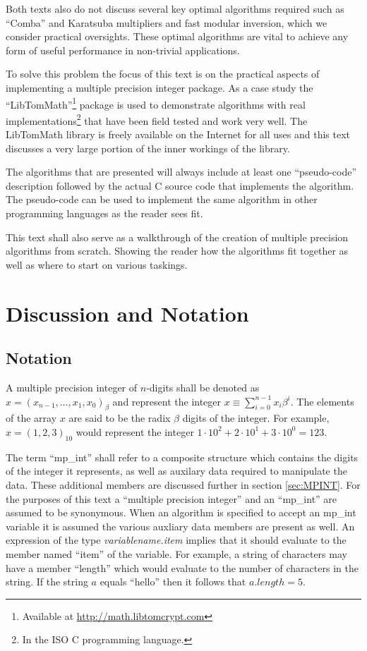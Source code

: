 \documentclass[b5paper]{book}
\begin{document}
Both texts also do not discuss several key optimal algorithms required such as ``Comba'' and Karatsuba multipliers 
and fast modular inversion, which we consider practical oversights.  These optimal algorithms are vital to achieve 
any form of useful performance in non-trivial applications.  

To solve this problem the focus of this text is on the practical aspects of implementing a multiple precision integer
package.  As a case study the ``LibTomMath''\footnote{Available at \url{http://math.libtomcrypt.com}} package is used 
to demonstrate algorithms with real implementations\footnote{In the ISO C programming language.} that have been field 
tested and work very well.  The LibTomMath library is freely available on the Internet for all uses and this text 
discusses a very large portion of the inner workings of the library.

The algorithms that are presented will always include at least one ``pseudo-code'' description followed 
by the actual C source code that implements the algorithm.  The pseudo-code can be used to implement the same 
algorithm in other programming languages as the reader sees fit.  

This text shall also serve as a walkthrough of the creation of multiple precision algorithms from scratch.  Showing
the reader how the algorithms fit together as well as where to start on various taskings.  

\section{Discussion and Notation}
\subsection{Notation}
A multiple precision integer of $n$-digits shall be denoted as $x = (x_{n-1}, \ldots, x_1, x_0)_{ \beta }$ and represent
the integer $x \equiv \sum_{i=0}^{n-1} x_i\beta^i$.  The elements of the array $x$ are said to be the radix $\beta$ digits 
of the integer.  For example, $x = (1,2,3)_{10}$ would represent the integer 
$1\cdot 10^2 + 2\cdot10^1 + 3\cdot10^0 = 123$.  

The term ``mp\_int'' shall refer to a composite structure which contains the digits of the integer it represents, as well 
as auxilary data required to manipulate the data.  These additional members are discussed further in section 
\ref{sec:MPINT}.  For the purposes of this text a ``multiple precision integer'' and an ``mp\_int'' are assumed to be 
synonymous.  When an algorithm is specified to accept an mp\_int variable it is assumed the various auxliary data members 
are present as well.  An expression of the type \textit{variablename.item} implies that it should evaluate to the 
member named ``item'' of the variable.  For example, a string of characters may have a member ``length'' which would 
evaluate to the number of characters in the string.  If the string $a$ equals ``hello'' then it follows that 
$a.length = 5$.  
\end{document}

